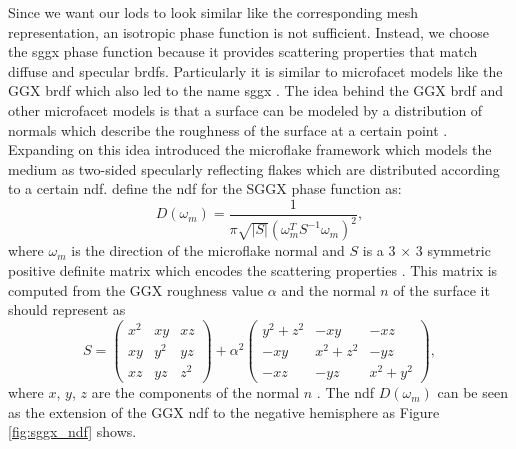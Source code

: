 Since we want our \acp{lod} to look similar like the corresponding mesh representation, an isotropic phase function is not sufficient.
Instead, we choose the \acs{sggx} phase function \cite{sggx} because it provides scattering properties that match diffuse and specular \acsp{brdf}.
Particularly it is similar to microfacet models like the GGX \acs{brdf} \cite{ggx} which also led to the name \acf{sggx} \cite{sggx}.
The idea behind the GGX \ac{brdf} and other microfacet models is that a surface can be modeled by a distribution of normals which describe the roughness of the surface at a certain point \cite{ggx}.
Expanding on this idea \citeauthor{microflake} \cite{microflake} introduced the microflake framework which models the medium as two-sided specularly reflecting flakes which are distributed according to a certain \ac{ndf}.
\citeauthor{sggx} \cite{sggx} define the \ac{ndf} for the SGGX phase function as:
\begin{equation*}
    D(\omega_m)=\frac{1}{\pi \sqrt{|S|}(\omega_m^T S^{-1} \omega_m)^2},
\end{equation*}
where $\omega_m$ is the direction of the microflake normal and $S$ is a 3 $\times$ 3 symmetric positive definite matrix which encodes the scattering properties \cite{sggx}.
This matrix is computed from the GGX roughness value $\alpha$ and the normal $n$ of the surface it should represent as
\begin{equation*}
    S=\begin{pmatrix}x^2 & xy & xz \\ xy & y^2 & yz \\ xz & yz & z^2\end{pmatrix} + \alpha^2\begin{pmatrix}y^2 + z^2 & -xy & -xz \\ -xy & x^2+z^2 & -yz \\ -xz & -yz & x^2+y^2\end{pmatrix},
\end{equation*}
where $x$, $y$, $z$ are the components of the normal $n$ \cite{sggx}.
The \ac{ndf} $D(\omega_m)$ can be seen as the extension of the GGX \acs{ndf} to the negative hemisphere as Figure \ref{fig:sggx_ndf} shows.
